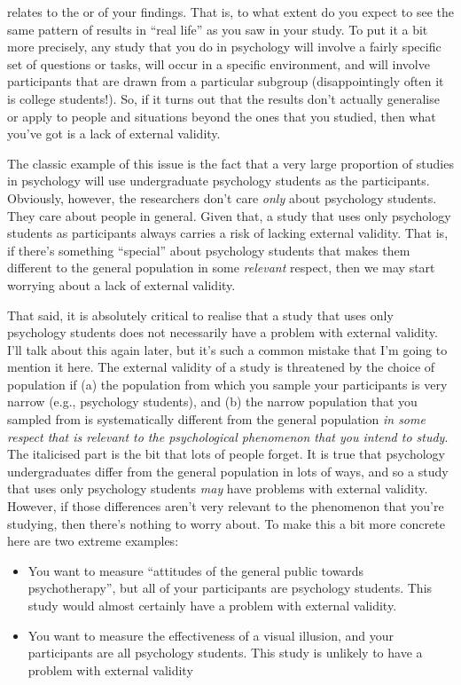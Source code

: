 
 relates to the  or  of your findings. That is, to what extent do you expect to see the same pattern of results in ``real life'' as you saw in your study. To put it a bit more precisely, any study that you do in psychology will involve a fairly specific set of questions or tasks, will occur in a specific environment, and will involve participants that are drawn from a particular subgroup (disappointingly often it is college students!). So, if it turns out that the results don't actually generalise or apply to people and situations beyond the ones that you studied, then what you've got is a lack of external validity.

The classic example of this issue is the fact that a very large proportion of studies in psychology will use undergraduate psychology students as the participants. Obviously, however, the researchers don't care {\it only} about psychology students. They care about people in general. Given that, a study that uses only psychology students as participants always carries a risk of lacking external validity. That is, if there's something ``special'' about psychology students that makes them different to the general population in some {\it relevant} respect, then we may start worrying about a lack of external validity.

That said, it is absolutely critical to realise that a study that uses only psychology students does not necessarily have a problem with external validity. I'll talk about this again later, but it's such a common mistake that I'm going to mention it here. The external validity of a study is threatened by the choice of population if (a) the population from which you sample  your participants is very narrow (e.g., psychology students), and (b) the narrow population that you sampled from is systematically different from the general population {\it in some respect that is relevant to the psychological phenomenon that you intend to study}. The italicised part is the bit that lots of people forget. It is true that psychology undergraduates differ from the general population in lots of ways, and so a study that uses only psychology students {\it may} have problems with external validity. However, if those differences aren't very relevant to the phenomenon that you're studying, then there's nothing to worry about. To make this a bit more concrete here are two extreme examples:
\begin{itemize}
\item You want to measure ``attitudes of the general public towards psychotherapy'', but all of your participants are psychology students. This study would almost certainly have a problem with external validity.
\item You want to measure the effectiveness of a visual illusion, and your participants are all psychology students. This study is unlikely to have a problem with external validity
\end{itemize}

